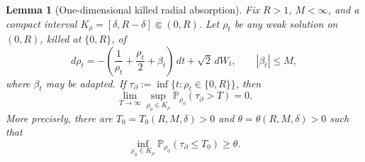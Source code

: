 \documentclass[11pt]{amsart}
\numberwithin{equation}{section}
\theoremstyle{plain}
\newtheorem{lemma}[lemma]{Lemma}
\theoremstyle{definition}
\theoremstyle{remark}
\begin{document}
\begin{lemma}[One-dimensional killed radial absorption]
\label{lem:one-dimensional-killed-radial-absorption}
Fix \(R>1\), \(M<\infty\), and a compact interval
\(K_\rho=[\delta,R-\delta]\Subset(0,R)\).  Let \(\rho_t\) be any weak solution
on \((0,R)\), killed at \(\{0,R\}\), of
\[
   d\rho_t
   =
   -\left(\frac1{\rho_t}+\frac{\rho_t}{2}+\beta_t\right)\,dt
   +\sqrt2\,dW_t,
   \qquad |\beta_t|\le M,
\]
where \(\beta_t\) may be adapted.  If
\(\tau_\partial:=\inf\{t:\rho_t\in\{0,R\}\}\), then
\[
   \lim_{T\to\infty}
   \sup_{\rho_0\in K_\rho}
   \mathbb P_{\rho_0}(\tau_\partial>T)=0 .
\]
More precisely, there are \(T_0=T_0(R,M,\delta)>0\) and
\(\theta=\theta(R,M,\delta)>0\) such that
\[
   \inf_{\rho_0\in K_\rho}
   \mathbb P_{\rho_0}(\tau_\partial\le T_0)\ge\theta .
\]
\end{lemma}
\end{document}
